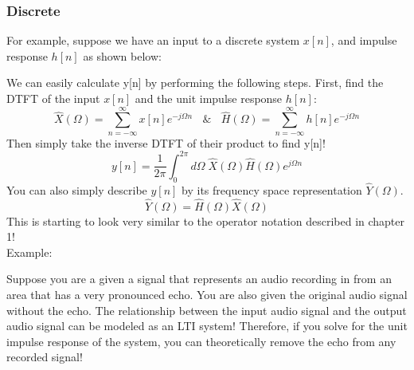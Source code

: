 \documentclass[a4paper]{article}
\numberwithin{equation}{section}
\begin{document}
\subsubsection{Discrete}

For example, suppose we have an input to a discrete system $x[n]$, and impulse response $h[n]$ as shown below:
\begin{center}
\end{center}

We can easily calculate y[n] by performing the following steps. First, find the DTFT of the input $x[n]$ and the unit impulse response $h[n]$:
\begin{equation}
\hat{X}(\Omega)=\sum_{n=-\infty}^{\infty}x[n]e^{-j\Omega n} \: \: \: \: \& \: \: \: \: \hat{H}(\Omega)=\sum_{n=-\infty}^{\infty}h[n]e^{-j\Omega n}
\end{equation}
Then simply take the inverse DTFT of their product to find y[n]!
\begin{equation}
y[n] = \frac{1}{2\pi}\int_{0}^{2\pi}d\Omega \; \hat{X}(\Omega)\hat{H}(\Omega)e^{j\Omega n}
\end{equation}
You can also simply describe $y[n]$ by its frequency space representation $\hat{Y}(\Omega)$. 
\begin{equation}
\hat{Y}(\Omega)= \hat{H}(\Omega)\hat{X}(\Omega)
\end{equation}
This is starting to look very similar to the operator notation described in chapter 1!\\

Example:
\smallskip

Suppose you are a given a signal that represents an audio recording in from an area that has a very pronounced echo. You are also given the original audio signal without the echo. The relationship between the input audio signal and the output audio signal can be modeled as an LTI system! Therefore, if you solve for the unit impulse response of the system, you can theoretically remove the echo from any recorded signal!
\end{document}
